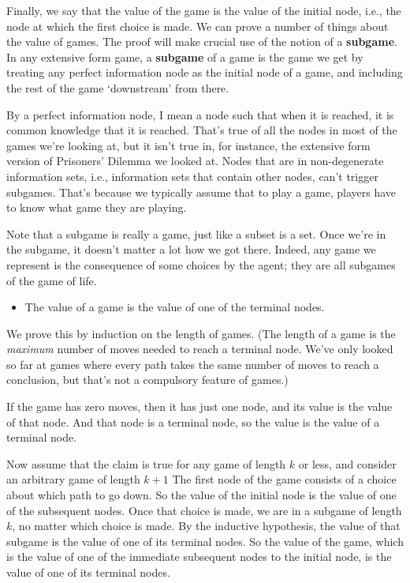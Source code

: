 \documentclass[
  11pt,
  letterpaper,
]{scrbook}
\providecommand{\tightlist}{%
  \setlength{\itemsep}{0pt}\setlength{\parskip}{0pt}}
\begin{document}
Finally, we say that the value of the game is the value of the initial
node, i.e., the node at which the first choice is made. We can prove a
number of things about the value of games. The proof will make crucial
use of the notion of a \textbf{subgame}. In any extensive form game, a
\textbf{subgame} of a game is the game we get by treating any perfect
information node as the initial node of a game, and including the rest
of the game `downstream' from there.

By a perfect information node, I mean a node such that when it is
reached, it is common knowledge that it is reached. That's true of all
the nodes in most of the games we're looking at, but it isn't true in,
for instance, the extensive form version of Prisoners' Dilemma we looked
at. Nodes that are in non-degenerate information sets, i.e., information
sets that contain other nodes, can't trigger subgames. That's because we
typically assume that to play a game, players have to know what game
they are playing.

Note that a subgame is really a game, just like a subset is a set. Once
we're in the subgame, it doesn't matter a lot how we got there. Indeed,
any game we represent is the consequence of some choices by the agent;
they are all subgames of the game of life.

\begin{itemize}
\tightlist
\item
  The value of a game is the value of one of the terminal nodes.
\end{itemize}

We prove this by induction on the length of games. (The length of a game
is the \emph{maximum} number of moves needed to reach a terminal node.
We've only looked so far at games where every path takes the same number
of moves to reach a conclusion, but that's not a compulsory feature of
games.)

If the game has zero moves, then it has just one node, and its value is
the value of that node. And that node is a terminal node, so the value
is the value of a terminal node.

Now assume that the claim is true for any game of length \(k\) or less,
and consider an arbitrary game of length \(k + 1\) The first node of the
game consists of a choice about which path to go down. So the value of
the initial node is the value of one of the subsequent nodes. Once that
choice is made, we are in a subgame of length \(k\), no matter which
choice is made. By the inductive hypothesis, the value of that subgame
is the value of one of its terminal nodes. So the value of the game,
which is the value of one of the immediate subsequent nodes to the
initial node, is the value of one of its terminal nodes.
\end{document}
